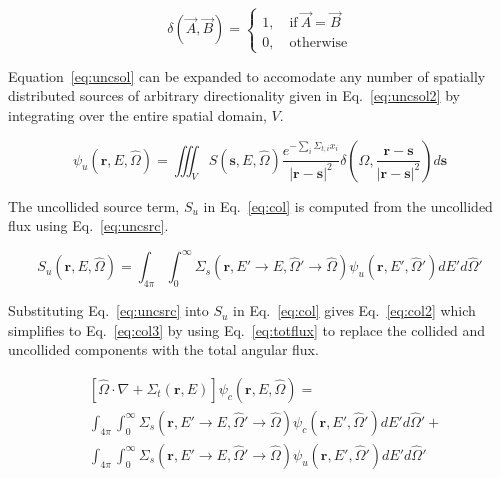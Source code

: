 \begin{equation} \label{eq:kronecker}
\delta(\vec{A}, \vec{B}) = 
\begin{cases}
1, \quad \mathrm{if} \ \vec{A}=\vec{B} \\
0, \quad \mathrm{otherwise}
\end{cases}
\end{equation}

Equation~\ref{eq:uncsol} can be expanded to accomodate any number of spatially distributed sources of arbitrary directionality given in Eq.~\ref{eq:uncsol2} by integrating over the entire spatial domain, $V$.

\begin{equation} \label{eq:uncsol2}
\psi_u(\boldsymbol{r}, E, \hat{\Omega}) = \iiint_{V}
S(\boldsymbol{s}, E, \hat{\Omega})
\frac{e^{-\sum_i \Sigma_{t,i} x_i}}{|\boldsymbol{r}-\boldsymbol{s}|^2}
\delta\left( \hat{\Omega}, \frac{\boldsymbol{r}-\boldsymbol{s}}{|\boldsymbol{r}-\boldsymbol{s}|^2}\right)
d \boldsymbol{s}
\end{equation}

The uncollided source term, $S_u$ in Eq.~\ref{eq:col} is computed from the uncollided flux using Eq.~\ref{eq:uncsrc}.

\begin{equation} \label{eq:uncsrc}
S_u(\boldsymbol{r}, E, \hat{\Omega}) = \int_{4\pi} \int_{0}^{\infty} 
\Sigma_s(\boldsymbol{r}, E' \rightarrow E, \hat{\Omega}' \rightarrow \hat{\Omega}) \psi_u(\boldsymbol{r}, E', \hat{\Omega}') 
dE' d\hat{\Omega}'
\end{equation}

Substituting Eq.~\ref{eq:uncsrc} into $S_u$ in Eq.~\ref{eq:col} gives Eq.~\ref{eq:col2} which simplifies to Eq.~\ref{eq:col3} by using Eq.~\ref{eq:totflux} to replace the collided and uncollided components with the total angular flux.

\begin{equation} \label{eq:col2}
\begin{split}
	&\left[ \hat{\Omega} \cdot \nabla + \Sigma_t(\boldsymbol{r}, E) \right]
	\psi_c(\boldsymbol{r}, E, \hat{\Omega}) = \\
	&\int_{4 \pi} \int_0^\infty \Sigma_s(\boldsymbol{r}, E' \rightarrow E, \hat{\Omega}' \rightarrow \hat{\Omega}) \psi_c(\boldsymbol{r}, E', \hat{\Omega}') dE' d\hat{\Omega}' + \\
	&\int_{4\pi} \int_{0}^{\infty} 
\Sigma_s(\boldsymbol{r}, E' \rightarrow E, \hat{\Omega}' \rightarrow \hat{\Omega}) \psi_u(\boldsymbol{r}, E', \hat{\Omega}') 
dE' d\hat{\Omega}'
\end{split}
\end{equation}

